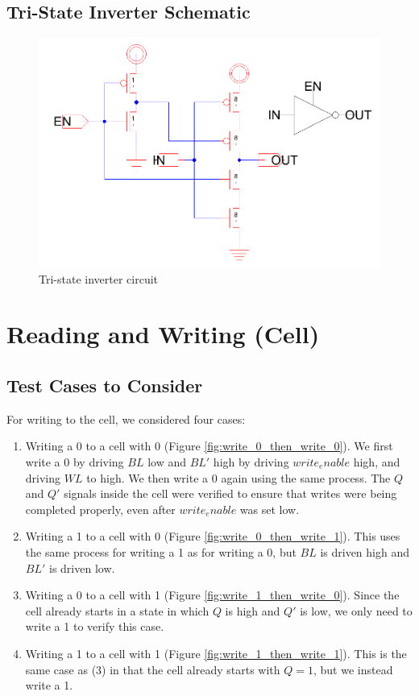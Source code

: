 \documentclass[12pt]{report}
\begin{document}
\subsection*{Tri-State Inverter Schematic}
\begin{figure}[H]
  \centering
    \includegraphics[width=1.0\textwidth]{tristate_inverter_circuit.PNG}
  \caption{Tri-state inverter circuit}
  \label{fig:tristate_inverter_circuit}
\end{figure}


\section*{Reading and Writing (Cell)}
\subsection*{Test Cases to Consider}
For writing to the cell, we considered four cases:
\begin{enumerate}
\item Writing a 0 to a cell with 0 (Figure \ref{fig:write_0_then_write_0}). We first write a 0 by driving $BL$ low and $BL'$ high by driving $write_enable$ high, and driving $WL$ to high. We then write a 0 again using the same process. The $Q$ and $Q'$ signals inside the cell were verified to ensure that writes were being completed properly, even after $write_enable$ was set low.
\item Writing a 1 to a cell with 0 (Figure \ref{fig:write_0_then_write_1}). This uses the same process for writing a 1 as for writing a 0, but $BL$ is driven high and $BL'$ is driven low.
\item Writing a 0 to a cell with 1 (Figure \ref{fig:write_1_then_write_0}). Since the cell already starts in a state in which $Q$ is high and $Q'$ is low, we only need to write a 1 to verify this case.
\item Writing a 1 to a cell with 1 (Figure \ref{fig:write_1_then_write_1}). This is the same case as (3) in that the cell already starts with $Q = 1$, but we instead write a 1.
\end{enumerate}
\end{document}
